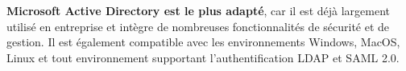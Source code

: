 \documentclass[../Livrable1.tex]{subfiles}
\begin{document}
\vspace{0.5cm}

\FloatBarrier
\textbf{Microsoft Active Directory est le plus adapté}, car il est déjà largement utilisé en entreprise et intègre de nombreuses fonctionnalités de sécurité et de gestion. Il est également compatible avec les environnements Windows, MacOS, Linux et tout environnement supportant l'authentification LDAP et SAML 2.0.
\end{document}
